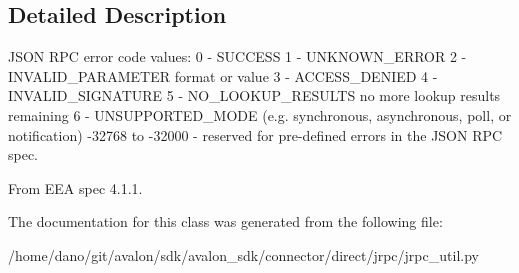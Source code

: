 \subsection{Detailed Description}
\begin{DoxyVerb}JSON RPC error code values:
0 - SUCCESS
1 - UNKNOWN_ERROR
2 - INVALID_PARAMETER format or value
3 - ACCESS_DENIED
4 - INVALID_SIGNATURE
5 - NO_LOOKUP_RESULTS no more lookup results remaining
6 - UNSUPPORTED_MODE (e.g. synchronous, asynchronous, poll,
    or notification)
-32768 to -32000 - reserved for pre-defined errors in the JSON RPC spec.

From EEA spec 4.1.1.
\end{DoxyVerb}
 

The documentation for this class was generated from the following file\+:\begin{DoxyCompactItemize}
\item 
/home/dano/git/avalon/sdk/avalon\+\_\+sdk/connector/direct/jrpc/jrpc\+\_\+util.\+py\end{DoxyCompactItemize}
